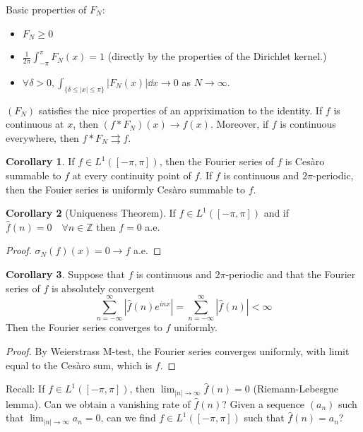 \documentclass{article}
\theoremstyle{definition}
\newtheorem{cor}{Corollary}
\newcommand{\ZZ}{\mathbb Z}
\begin{document}
Basic properties of $F_N$:
\begin{itemize}
	\item $F_N \geq 0$

	\item $\frac{1}{2 \pi} \int_{- \pi}^\pi F_N(x) = 1$ (directly by the properties of the Dirichlet kernel.)

	\item $\forall \delta > 0, \int_{\{\delta \leq |x| \leq \pi\}} |F_N(x)| \dd{x} \to 0$ as $N \to \infty$.
\end{itemize}

$(F_N)$ satisfies the nice properties of an appriximation to the identity.
If $f$ is continuous at $x$, then $(f * F_N)(x) \to f(x)$.
Moreover, if $f$ is continuous everywhere, then $f * F_N \rightrightarrows f$.

\begin{cor}
	If $f \in L^1([-\pi, \pi])$, then the Fourier series of $f$ is Ces\`aro summable to $f$ at every continuity point of $f$.
	If $f$ is continuous and $2 \pi$-periodic, then the Fouier series is uniformly Ces\`aro summable to $f$.
\end{cor}

\begin{cor}[Uniqueness Theorem]
	If $f \in L^1([-\pi, \pi])$ and if $\hat{f}(n) = 0 \quad \forall n \in \ZZ$ then $f = 0$ a.e.
\end{cor}

\begin{proof}
	$\sigma_N(f)(x) = 0 \to f$ a.e.
\end{proof}

\begin{cor}
	Suppose that $f$ is continuous and $2 \pi$-periodic and that the Fourier series of $f$ is absolutely convergent
	\[
		\sum_{n = -\infty}^\infty |\hat{f}(n) e^{inx}| = \sum_{n = -\infty}^\infty |\hat{f}(n)| < \infty
	\]
	Then the Fourier series converges to $f$ uniformly.
\end{cor}

\begin{proof}
	By Weierstrass M-test, the Fourier series converges uniformly, with limit equal to the Ces\`aro sum, which is $f$.
\end{proof}

Recall: If $f \in L^1([-\pi, \pi])$, then $\lim_{|n| \to \infty} \hat{f}(n) = 0$ (Riemann-Lebesgue lemma).
Can we obtain a vanishing rate of $\hat{f}(n)$?
Given a sequence $(a_n)$ such that $\lim_{|n| \to \infty} a_n = 0$, can we find $f \in L^1([-\pi, \pi])$ such that $\hat{f}(n) = a_n$?
\end{document}
